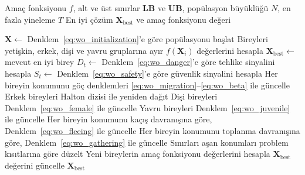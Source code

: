 \begin{algorithm}[htbp]
\caption{Walrus Optimizer (WO)}
\label{alg:wo}
\begin{algorithmic}[1]
\Require Amaç fonksiyonu $f$, alt ve üst sınırlar $\mathbf{LB}$ ve
         $\mathbf{UB}$, popülasyon büyüklüğü $N$, en fazla yineleme $T$
\Ensure En iyi çözüm $\mathbf{X}_{\mathrm{best}}$ ve amaç fonksiyonu değeri

\State $\mathbf{X}\gets$ Denklem~\eqref{eq:wo_initialization}'e göre popülasyonu başlat
\State Bireyleri yetişkin, erkek, dişi ve yavru gruplarına ayır
\State $f(\mathbf{X}_i)$ değerlerini hesapla
\State $\mathbf{X}_{\mathrm{best}}\gets$ mevcut en iyi birey
    \State $D_t\gets$ Denklem~\eqref{eq:wo_danger}'e göre tehlike sinyalini hesapla
    \State $S_t\gets$ Denklem~\eqref{eq:wo_safety}'e göre güvenlik sinyalini hesapla
        \State Her bireyin konumunu göç denklemleri
               \eqref{eq:wo_migration}--\eqref{eq:wo_beta} ile güncelle
    \Else
            \State Erkek bireyleri Halton dizisi ile yeniden dağıt
            \State Dişi bireyleri Denklem~\eqref{eq:wo_female} ile güncelle
            \State Yavru bireyleri Denklem~\eqref{eq:wo_juvenile} ile güncelle
        \Else
                \State Her bireyin konumunu kaçış davranışına
                       göre, Denklem~\eqref{eq:wo_fleeing} ile güncelle
            \Else
                \State Her bireyin konumunu toplanma davranışına
                       göre, Denklem~\eqref{eq:wo_gathering} ile güncelle
            \EndIf
        \EndIf
    \EndIf
    \State Sınırları aşan konumları problem kısıtlarına göre düzelt
    \State Yeni bireylerin amaç fonksiyonu değerlerini hesapla
    \State $\mathbf{X}_{\mathrm{best}}$ değerini güncelle
\EndFor
\State \Return $\mathbf{X}_{\mathrm{best}}$
\end{algorithmic}
\end{algorithm}
